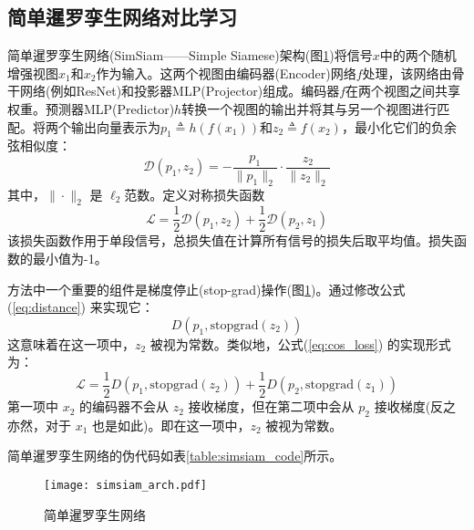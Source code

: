 \documentclass[master]{thesis-uestc}
\begin{document}
\subsection{简单暹罗孪生网络对比学习}
简单暹罗孪生网络(SimSiam——Simple Siamese)架构(图\ref{simsiam_arch})将信号$x$中的两个随机增强视图$x_1$和$x_2$作为输入。这两个视图由编码器(Encoder)网络$f$处理，该网络由骨干网络(例如ResNet)和投影器MLP(Projector)组成。编码器$f$在两个视图之间共享权重。预测器MLP(Predictor)$h$转换一个视图的输出并将其与另一个视图进行匹配。将两个输出向量表示为$p_1 \triangleq h(f(x_1))$和$z_2 \triangleq f(x_2)$，最小化它们的负余弦相似度：
\begin{equation}
    \mathcal{D}(p_1, z_2) = -\frac{p_1}{\|p_1\|_2} \cdot \frac{z_2}{\|z_2\|_2}
    \label{eq:distance}
\end{equation}  
其中，$\|\cdot\|_2$ 是 $\ell_2$范数。定义对称损失函数
\begin{equation}
    \mathcal{L} = \frac{1}{2} \mathcal{D}(p_{1}, z_{2}) + \frac{1}{2} \mathcal{D}(p_{2}, z_{1})
\label{eq:cos_loss}
\end{equation}
该损失函数作用于单段信号，总损失值在计算所有信号的损失后取平均值。损失函数的最小值为-1。

方法中一个重要的组件是梯度停止(stop-grad)操作(图\ref{simsiam_arch})。通过修改公式(\ref{eq:distance}) 来实现它：
\begin{equation}
    D(p_1, \text{stopgrad}(z_2))
\label{eq:stopgrad}
\end{equation}
这意味着在这一项中，\( z_2 \) 被视为常数。类似地，公式(\ref{eq:cos_loss}) 的实现形式为：
\begin{equation}
\mathcal{L} = \frac{1}{2} D(p_1, \text{stopgrad}(z_2)) + \frac{1}{2} D(p_2, \text{stopgrad}(z_1))
\label{eq:cos_loss_stopgrad}
\end{equation}
第一项中 \( x_2 \) 的编码器不会从 \( z_2 \) 接收梯度，但在第二项中会从 \( p_2 \) 接收梯度(反之亦然，对于 \( x_1 \) 也是如此)。即在这一项中，\( z_2 \) 被视为常数。

简单暹罗孪生网络的伪代码如表\ref{table:simsiam_code}所示。

\begin{figure}[h]
    \texttt{[image: simsiam\_arch.pdf]}
    \caption{简单暹罗孪生网络}
    \label{simsiam_arch}
\end{figure}
\end{document}
